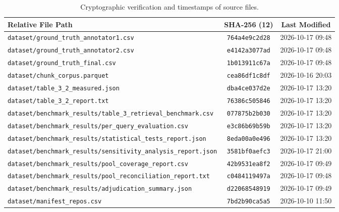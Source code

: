 \begin{table}[htbp]
\caption{Cryptographic verification and timestamps of source files.}
\label{tab:file_provenance}
\centering\scriptsize
\setlength{\tabcolsep}{12pt}
\begin{tabular}{@{}lcc@{}}
\toprule
Relative File Path & SHA-256 (12) & Last Modified \\
\midrule
\texttt{dataset/ground\_truth\_annotator1.csv} & \texttt{764a4e9c2d28} & 2026-10-17 09:48 \\
\texttt{dataset/ground\_truth\_annotator2.csv} & \texttt{e4142a3077ad} & 2026-10-17 09:48 \\
\texttt{dataset/ground\_truth\_final.csv} & \texttt{1b013911c67a} & 2026-10-17 09:48 \\
\texttt{dataset/chunk\_corpus.parquet} & \texttt{cea86df1c8df} & 2026-10-16 20:03 \\
\texttt{dataset/table\_3\_2\_measured.json} & \texttt{dba4ce037d2e} & 2026-10-17 13:20 \\
\texttt{dataset/table\_3\_2\_report.txt} & \texttt{76386c505846} & 2026-10-17 13:20 \\
\texttt{dataset/benchmark\_results/table\_3\_retrieval\_benchmark.csv} & \texttt{077875b2b030} & 2026-10-17 13:20 \\
\texttt{dataset/benchmark\_results/per\_query\_evaluation.csv} & \texttt{e3c86b69b59b} & 2026-10-17 13:20 \\
\texttt{dataset/benchmark\_results/statistical\_tests\_report.json} & \texttt{8eda00a0e496} & 2026-10-17 13:20 \\
\texttt{dataset/benchmark\_results/sensitivity\_analysis\_report.json} & \texttt{3581bf0aefc3} & 2026-10-17 21:00 \\
\texttt{dataset/benchmark\_results/pool\_coverage\_report.csv} & \texttt{42b9531ea8f2} & 2026-10-17 09:49 \\
\texttt{dataset/benchmark\_results/pool\_reconciliation\_report.txt} & \texttt{c0484119497a} & 2026-10-17 09:48 \\
\texttt{dataset/benchmark\_results/adjudication\_summary.json} & \texttt{d22068548919} & 2026-10-17 09:49 \\
\texttt{dataset/manifest\_repos.csv} & \texttt{7bd2b90ca5a5} & 2026-10-10 11:50 \\
\bottomrule
\end{tabular}
\end{table}